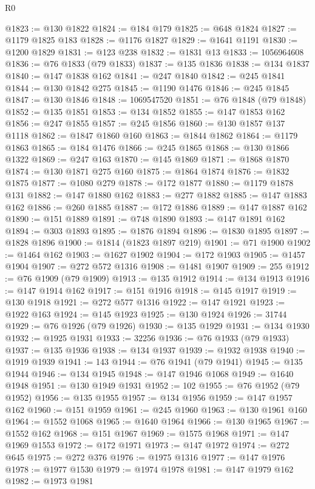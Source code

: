 \begin{lexlean}{R0}
\begin{coremodule}
@1823 := @130 @1822
@1824 := @184 @179
@1825 := @648 @1824
@1827 := @1179 @1825 @183
@1828 := @1176 @1827
@1829 := @1641 @1191
@1830 := @1200 @1829
@1831 := @123 @238
@1832 := @1831 @13
@1833 := 1056964608
@1836 := @76 @1833 (@79 @1833)
@1837 := @135 @1836
@1838 := @134 @1837
@1840 := @147 @1838 @162
@1841 := @247 @1840
@1842 := @245 @1841
@1844 := @130 @1842 @275
@1845 := @1190 @1476
@1846 := @245 @1845
@1847 := @130 @1846
@1848 := 1069547520
@1851 := @76 @1848 (@79 @1848)
@1852 := @135 @1851
@1853 := @134 @1852
@1855 := @147 @1853 @162
@1856 := @247 @1855
@1857 := @245 @1856
@1860 := @130 @1857 @137 @1118
@1862 := @1847 @1860 @160
@1863 := @1844 @1862
@1864 := @1179 @1863
@1865 := @184 @1476
@1866 := @245 @1865
@1868 := @130 @1866 @1322
@1869 := @247 @163
@1870 := @145 @1869
@1871 := @1868 @1870
@1874 := @130 @1871 @275 @160
@1875 := @1864 @1874
@1876 := @1832 @1875
@1877 := @1080 @279
@1878 := @172 @1877
@1880 := @1179 @1878 @131
@1882 := @147 @1880 @162
@1883 := @277 @1882
@1885 := @147 @1883 @162
@1886 := @260 @1885
@1887 := @172 @1886
@1889 := @147 @1887 @162
@1890 := @151 @1889
@1891 := @748 @1890
@1893 := @147 @1891 @162
@1894 := @303 @1893
@1895 := @1876 @1894
@1896 := @1830 @1895
@1897 := @1828 @1896
@1900 := @1814 (@1823 @1897 @219)
@1901 := @71 @1900
@1902 := @1464 @162
@1903 := @1627 @1902
@1904 := @172 @1903
@1905 := @1457 @1904
@1907 := @272 @572 @1316
@1908 := @1481 @1907
@1909 := 255
@1912 := @76 @1909 (@79 @1909)
@1913 := @135 @1912
@1914 := @134 @1913
@1916 := @147 @1914 @162
@1917 := @151 @1916
@1918 := @145 @1917
@1919 := @130 @1918
@1921 := @272 @577 @1316
@1922 := @147 @1921
@1923 := @1922 @163
@1924 := @145 @1923
@1925 := @130 @1924
@1926 := 31744
@1929 := @76 @1926 (@79 @1926)
@1930 := @135 @1929
@1931 := @134 @1930
@1932 := @1925 @1931
@1933 := 32256
@1936 := @76 @1933 (@79 @1933)
@1937 := @135 @1936
@1938 := @134 @1937
@1939 := @1932 @1938
@1940 := @1919 @1939
@1941 := 143
@1944 := @76 @1941 (@79 @1941)
@1945 := @135 @1944
@1946 := @134 @1945
@1948 := @147 @1946 @1068
@1949 := @1640 @1948
@1951 := @130 @1949 @1931
@1952 := 102
@1955 := @76 @1952 (@79 @1952)
@1956 := @135 @1955
@1957 := @134 @1956
@1959 := @147 @1957 @162
@1960 := @151 @1959
@1961 := @245 @1960
@1963 := @130 @1961 @160
@1964 := @1552 @1068
@1965 := @1640 @1964
@1966 := @130 @1965
@1967 := @1552 @162
@1968 := @151 @1967
@1969 := @1575 @1968
@1971 := @147 @1969 @1553
@1972 := @172 @1971
@1973 := @147 @1972
@1974 := @272 @645
@1975 := @272 @376
@1976 := @1975 @1316
@1977 := @147 @1976
@1978 := @1977 @1530
@1979 := @1974 @1978
@1981 := @147 @1979 @162
@1982 := @1973 @1981

\end{coremodule}
\end{lexlean}
